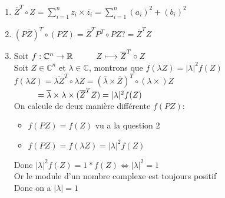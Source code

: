 \documentclass{article}
\newcommand\tab[1][1cm]{\hspace*{#1}}
\begin{document}
\newpage

\noindent \begin{enumerate}[label=\Alph*)]
    \item $\overline{Z}^T \circ Z = \sum_{i=1}^n z_i \times \overline{z_i} = \sum_{i=1}^n (a_i)^2 + (b_i)^2$ 
    \item $(P\overline{Z})^T \circ (PZ) = \overline{Z}^TP^T \circ PZ? = \overline{Z}^T Z$
    \item Soit $f: \mathbb{C}^n \rightarrow \mathbb{R}\\
    \tab Z \longmapsto \overline{Z}^T \circ Z$\\
    Soit $Z \in \mathbb{C}^n$ et $\lambda \in \mathbb{C}$, montrons que $f(\lambda Z) = |\lambda|^2f(Z)$\\
    $f(\lambda Z) = \overline{\lambda Z}^T \circ \lambda Z = (\overline{\lambda} \times \overline{Z})^T \circ (\lambda \times) Z$\\
    $\tab = \overline{\lambda} \times \lambda \times (\overline{Z}^T Z) = |\lambda|^2 f(Z)$\\
    On calcule de deux manière différente $f(PZ)$:
    \begin{itemize}
        \item $f(PZ) = f(Z)$ vu a la question 2
        \item $f(PZ) = f(\lambda Z) = |\lambda|^2 f(Z)$
    \end{itemize}
    Donc $|\lambda|^2 f(Z) = 1 * f(Z) \Leftrightarrow |\lambda|^2 = 1$\\
    Or le module d'un nombre complexe est toujours positif\\
    Donc on a $|\lambda| = 1$
\end{enumerate}
\end{document}
